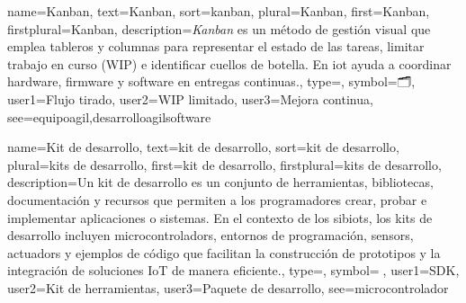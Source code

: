 	
	{
		name={Kanban},
		text={Kanban},
		sort={kanban},
		plural={Kanban},
		first={Kanban},
		firstplural={Kanban},
		description={\emph{Kanban} es un m{\'e}todo de gesti{\'o}n visual que emplea tableros y columnas para representar el estado de las tareas, limitar trabajo en curso (WIP) e identificar cuellos de botella. En \gls{iot} ayuda a coordinar hardware, firmware y software en entregas continuas.},
		type=\glsdefaulttype,
		symbol={🗂️},
		user1={Flujo tirado},
		user2={WIP limitado},
		user3={Mejora continua},
		see={equipoagil,desarrolloagilsoftware}
	}
	
	{
		name={Kit de desarrollo},
		text={kit de desarrollo},
		sort={kit de desarrollo},
		plural={kits de desarrollo},
		first={kit de desarrollo},
		firstplural={kits de desarrollo},
		description={Un kit de desarrollo es un conjunto de herramientas, bibliotecas, documentaci{\'o}n y recursos que permiten a los programadores crear, probar e implementar aplicaciones o sistemas. En el contexto de los \glspl{sibiot}, los kits de desarrollo incluyen \glspl{microcontrolador}, entornos de programaci{\'o}n, \glspl{sensor}, \glspl{actuador} y ejemplos de c{\'o}digo que facilitan la construcci{\'o}n de prototipos y la integraci{\'o}n de soluciones IoT de manera eficiente.},
		type=\glsdefaulttype,
		symbol={🧰},
		user1={SDK},
		user2={Kit de herramientas},
		user3={Paquete de desarrollo},
		see={microcontrolador}
	}
	
